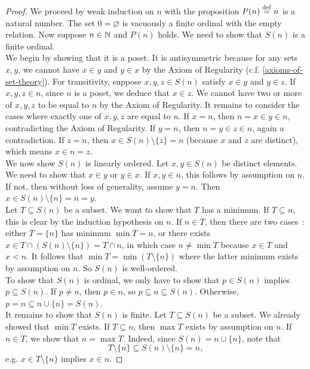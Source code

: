 \begin{proof}
    We proceed by weak induction on $n$ with the proposition $P(n) \overset{\mathrm{def}}{=} n$ is a natural number. The set $0 = \varnothing$ is vacuously a finite ordinal with the empty relation. Now suppose $n \in \operatorname{\mathbb N}$ and $P(n)$ holds. We need to show that $S(n)$ is a finite ordinal. 
    \\

    We begin by showing that it is a poset. It is antisymmetric because for any sets $x,y$, we cannot have $x \in y$ and $y \in x$ by the Axiom of Regularity (c.f. \autoref{axioms-of-set-theory}). For transitivity, suppose $x,y,z \in S(n)$ satisfy $x \in y$ and $y \in z$. If $x,y,z \in n$, since $n$ is a poset, we deduce that $x \in z$. We cannot have two or more of $x,y,z$ to be equal to $n$ by the Axiom of Regularity. It remains to consider the cases where exactly one of $x,y,z$ are equal to $n$. If $x = n$, then $n = x \in y \in n$, contradicting the Axiom of Regularity. If $y = n$, then $n = y \in z \in n$, again a contradiction. If $z = n$, then $x \in S(n) \setminus \{z\} = n$ (because $x$ and $z$ are distinct), which means $x \in n = z$.
    \\

    We now show $S(n)$ is linearly ordered. Let $x,y \in S(n)$ be distinct elements. We need to show that $x \in y$ or $y \in x$. If $x,y \in n$, this follows by assumption on $n$. If not, then without loss of generality, assume $y = n$. Then $x \in S(n) \setminus \{n\} = n = y$.
    \\

    Let $T \subseteq S(n)$ be a subset. We want to show that $T$ has a minimum. If $T \subseteq n$, this is clear by the induction hypothesis on $n$. If $n \in T$, then there are two cases~: either $T = \{n\}$ has minimum $\min T = n$, or there exists $x \in T \cap (S(n) \setminus \{n\}) = T \cap n$, in which case $n \neq \min T$ because $x \in T$ and $x < n$. It follows that $\min T = \min(T \setminus \{n\})$ where the latter minimum exists by assumption on $n$. So $S(n)$ is well-ordered.
    \\

    To show that $S(n)$ is ordinal, we only have to show that $p \in S(n)$ implies $p \subseteq S(n)$. If $p \neq n$, then $p \in n$, so $p \subseteq n \subseteq S(n)$. Otherwise, $p = n \subseteq n \cup \{n\} = S(n)$. 
    \\

    It remains to show that $S(n)$ is finite. Let $T \subseteq S(n)$ be a subset. We already showed that $\min T$ exists. If $T \subseteq n$, then $\max T$ exists by assumption on $n$. If $n \in T$, we show that $n = \max T$. Indeed, since $S(n) = n \cup \{n\}$, note that
    \[
        T \setminus \{n\} \subseteq S(n) \setminus \{n\} = n,
    \]
    e.g. $x \in T \setminus \{n\}$ implies $x \in n$.
\end{proof}

